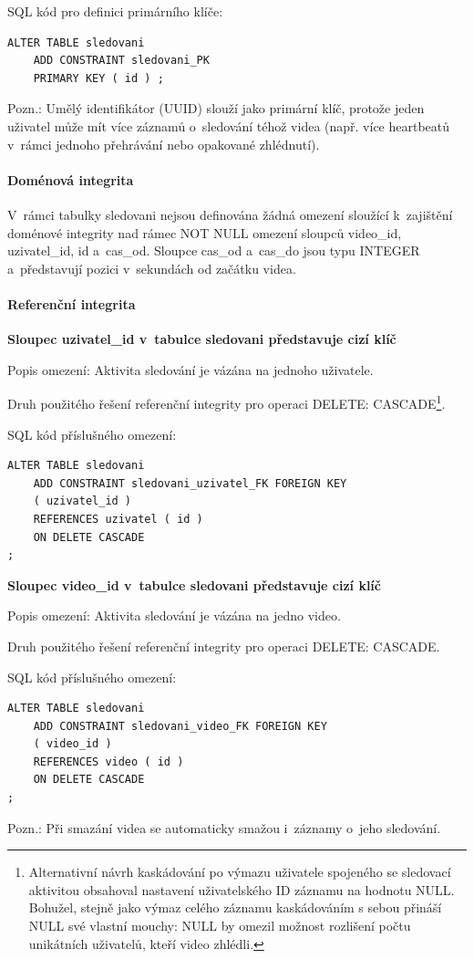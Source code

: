 \documentclass[12pt,a4paper]{article}
\begin{document}
SQL kód pro definici primárního klíče:
\begin{lstlisting}
ALTER TABLE sledovani
    ADD CONSTRAINT sledovani_PK
    PRIMARY KEY ( id ) ;
\end{lstlisting}
Pozn.: Umělý identifikátor (UUID) slouží jako primární klíč, protože jeden uživatel může
mít více záznamů o~sledování téhož videa (např. více heartbeatů v~rámci jednoho přehrávání
nebo opakované zhlédnutí).

\paragraph{Doménová integrita}
V~rámci tabulky sledovani nejsou definována žádná omezení sloužící k~zajištění doménové
integrity nad rámec NOT NULL omezení sloupců video\_id, uzivatel\_id, id a~cas\_od.
Sloupce cas\_od a~cas\_do jsou typu INTEGER a~představují pozici v~sekundách od začátku
videa.

\paragraph{Referenční integrita}

\textbf{Sloupec uzivatel\_id v~tabulce sledovani představuje cizí klíč}

Popis omezení: Aktivita sledování je vázána na jednoho uživatele.

Druh použitého řešení referenční integrity pro operaci DELETE: CASCADE\footnote{Alternativní návrh kaskádování po výmazu uživatele spojeného se sledovací aktivitou obsahoval nastavení uživatelského ID záznamu na hodnotu NULL. Bohužel, stejně jako výmaz celého záznamu kaskádováním s sebou přináší NULL své vlastní mouchy: NULL by omezil možnost rozlišení počtu unikátních uživatelů, kteří video zhlédli.}.

SQL kód příslušného omezení:
\begin{lstlisting}
ALTER TABLE sledovani
    ADD CONSTRAINT sledovani_uzivatel_FK FOREIGN KEY
    ( uzivatel_id )
    REFERENCES uzivatel ( id )
    ON DELETE CASCADE
;
\end{lstlisting}

\textbf{Sloupec video\_id v~tabulce sledovani představuje cizí klíč}

Popis omezení: Aktivita sledování je vázána na jedno video.

Druh použitého řešení referenční integrity pro operaci DELETE: CASCADE.

SQL kód příslušného omezení:
\begin{lstlisting}
ALTER TABLE sledovani
    ADD CONSTRAINT sledovani_video_FK FOREIGN KEY
    ( video_id )
    REFERENCES video ( id )
    ON DELETE CASCADE
;
\end{lstlisting}
Pozn.: Při smazání videa se automaticky smažou i~záznamy o~jeho sledování.
\end{document}
